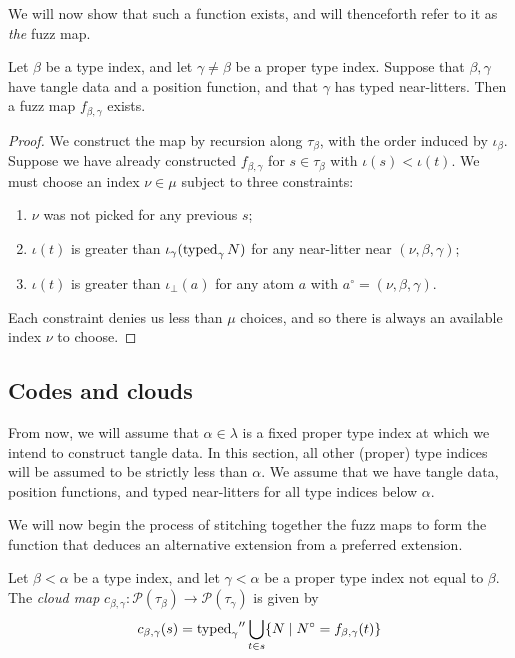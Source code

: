 We will now show that such a function exists, and will thenceforth refer to it as \emph{the} fuzz map.

\begin{proposition}
    Let \( \beta \) be a type index, and let \( \gamma \neq \beta \) be a proper type index.
    Suppose that \( \beta, \gamma \) have tangle data and a position function, and that \( \gamma \) has typed near-litters.
    Then a fuzz map \( f_{\beta,\gamma} \) exists.
\end{proposition}
\begin{proof}
    We construct the map by recursion along \( \tau_\beta \), with the order induced by \( \iota_\beta \).
    Suppose we have already constructed \( f_{\beta,\gamma} \) for \( s \in \tau_\beta \) with \( \iota(s) < \iota(t) \).
    We must choose an index \( \nu \in \mu \) subject to three constraints:
    \begin{enumerate}
        \item \( \nu \) was not picked for any previous \( s \);
        \item \( \iota(t) \) is greater than \( \iota_\gamma(\operatorname{typed}_\gamma N) \) for any near-litter near \( (\nu, \beta, \gamma) \);
        \item \( \iota(t) \) is greater than \( \iota_\bot(a) \) for any atom \( a \) with \( a^\circ = (\nu, \beta, \gamma) \).
    \end{enumerate}
    Each constraint denies us less than \( \mu \) choices, and so there is always an available index \( \nu \) to choose.
\end{proof}

\subsection{Codes and clouds}

From now, we will assume that \( \alpha \in \lambda \) is a fixed proper type index at which we intend to construct tangle data.
In this section, all other (proper) type indices will be assumed to be strictly less than \( \alpha \).
We assume that we have tangle data, position functions, and typed near-litters for all type indices below \( \alpha \).

We will now begin the process of stitching together the fuzz maps to form the function that deduces an alternative extension from a preferred extension.

\begin{definition}
    Let \( \beta < \alpha \) be a type index, and let \( \gamma < \alpha \) be a proper type index not equal to \( \beta \).
    The \emph{cloud map} \( c_{\beta,\gamma} : \mathcal P(\tau_\beta) \to \mathcal P(\tau_\gamma) \) is given by
    \[ c_{\beta,\gamma}(s) = {\operatorname{typed}_\gamma} '' \bigcup_{t \in s} \{ N \mid N^\circ = f_{\beta,\gamma}(t) \} \]
\end{definition}

